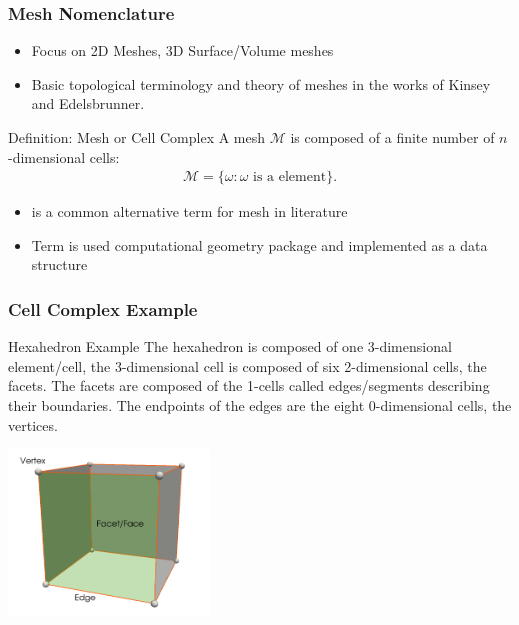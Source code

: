 \begin{frame}
	\frametitle{Mesh Nomenclature}
  \begin{itemize}
		\item Focus on 2D Meshes, 3D Surface/Volume meshes
		\item Basic topological terminology and theory of meshes in the works of Kinsey \cite{kinsey1993topology} and 
Edelsbrunner\cite{Edelsbrunner:2006:GTM:1137760}.		
  \end{itemize}		
  \begin{block}{Definition: Mesh or Cell Complex}
  A mesh $\mathcal M$ is composed of a finite number of $n$-dimensional cells: 
	\begin{align*}
   \mathcal M =\{\omega : \omega \text{ is a element}\}.  
  \end{align*}
  \end{block}	
  \begin{itemize}
		\item {} is a common alternative term for mesh in literature
		\item Term is used computational geometry package  and implemented as a data structure
  \end{itemize}			
\end{frame}

\begin{frame}
  \frametitle{Cell Complex Example}
	\begin{block}{Hexahedron Example}
   The hexahedron is composed of one 3-dimensional element/cell, the 3-dimensional cell is composed of six 2-dimensional cells, the facets. The facets are
	 composed of the 1-cells called edges/segments describing their boundaries. The endpoints of the edges are the eight 0-dimensional cells, the vertices.
	\end{block}
    \begin{center}
      \includegraphics[width=0.4\textwidth]{screenshots/hexa-cell2.png}
    \end{center}			
\end{frame}

